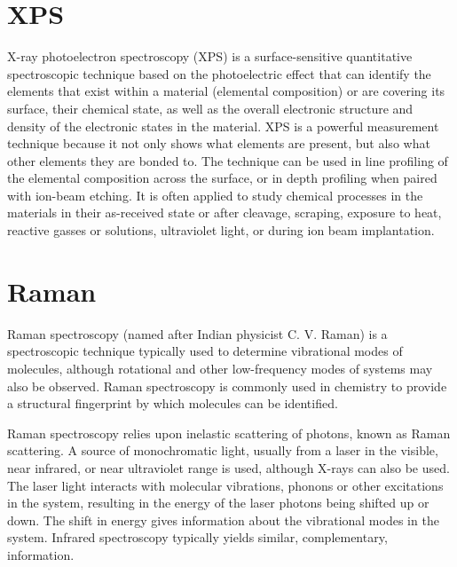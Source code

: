 \documentclass[book.tex]{subfiles}
\begin{document}
\section{XPS}
X-ray photoelectron spectroscopy (XPS) is a surface-sensitive quantitative spectroscopic technique based on the photoelectric effect that can identify the elements that exist within a material (elemental composition) or are covering its surface, their chemical state, as well as the overall electronic structure and density of the electronic states in the material. XPS is a powerful measurement technique because it not only shows what elements are present, but also what other elements they are bonded to. The technique can be used in line profiling of the elemental composition across the surface, or in depth profiling when paired with ion-beam etching. It is often applied to study chemical processes in the materials in their as-received state or after cleavage, scraping, exposure to heat, reactive gasses or solutions, ultraviolet light, or during ion beam implantation.
\section{Raman}
Raman spectroscopy (named after Indian physicist C. V. Raman) is a spectroscopic technique typically used to determine vibrational modes of molecules, although rotational and other low-frequency modes of systems may also be observed. Raman spectroscopy is commonly used in chemistry to provide a structural fingerprint by which molecules can be identified.

Raman spectroscopy relies upon inelastic scattering of photons, known as Raman scattering. A source of monochromatic light, usually from a laser in the visible, near infrared, or near ultraviolet range is used, although X-rays can also be used. The laser light interacts with molecular vibrations, phonons or other excitations in the system, resulting in the energy of the laser photons being shifted up or down. The shift in energy gives information about the vibrational modes in the system. Infrared spectroscopy typically yields similar, complementary, information.
\end{document}
